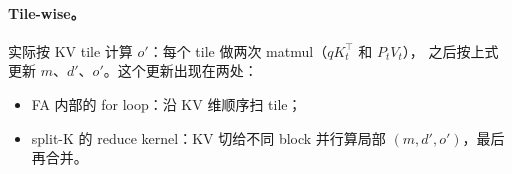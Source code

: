 \paragraph{Tile-wise。}
实际按 KV tile 计算 $o'$：每个 tile 做两次 matmul（$qK_t^\top$ 和 $P_t V_t$），
之后按上式更新 $m$、$d'$、$o'$。这个更新出现在两处：
\begin{itemize}
  \item FA 内部的 for loop：沿 KV 维顺序扫 tile；
  \item split-K 的 reduce kernel：KV 切给不同 block 并行算局部 $(m, d', o')$，最后再合并。
\end{itemize}
